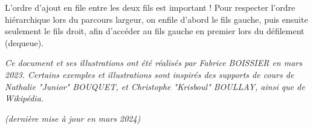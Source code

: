 \documentclass[11pt,a4paper]{article}
\begin{document}
\medskip

L'ordre d'ajout en file entre les deux fils est important !
Pour respecter l'ordre hiérarchique lors du parcours largeur, on enfile d'abord le fils gauche, puis ensuite seulement le fils droit, afin d'accéder au fils gauche en premier lors du défilement (dequeue).




\bigskip

\vfillFirst

\vfillLast


\begin{center}
\textit{Ce document et ses illustrations ont été réalisés par Fabrice BOISSIER en mars 2023.
Certains exemples et illustrations sont inspirés des supports de cours de Nathalie "Junior" BOUQUET, et Christophe "Krisboul" BOULLAY, ainsi que de Wikipédia.}

\textit{(dernière mise à jour en mars 2024)}
\end{center}
\end{document}
